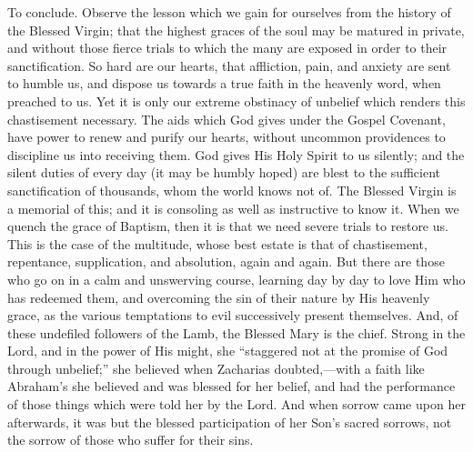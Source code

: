 To conclude. Observe the lesson which we gain for ourselves from the
history of the Blessed Virgin; that the highest graces of the soul may
be matured in private, and without those fierce trials to which the many
are exposed in order to their sanctification. So hard are our hearts,
that affliction, pain, and anxiety are sent to humble us, and dispose us
towards a true faith in the heavenly word, when preached to us. Yet it
is only our extreme obstinacy of unbelief which renders this
chastisement necessary. The aids which God gives under the Gospel
Covenant, have power to renew and purify our hearts, without uncommon
providences to discipline us into receiving them. God gives His Holy
Spirit to us silently; and the silent duties of every day (it may be
humbly hoped) are blest to the sufficient sanctification of thousands,
whom the world knows not of. The Blessed Virgin is a memorial of this;
and it is consoling as well as instructive to know it. When we quench
the grace of Baptism, then it is that we need severe trials to restore
us. This is the case of the multitude, whose best estate is that of
chastisement, repentance, supplication, and absolution, again and again.
But there are those who go on in a calm and unswerving course, learning
day by day to love Him who has redeemed them, and overcoming the sin of
their nature by His heavenly grace, as the various temptations to evil
successively present themselves. And, of these undefiled followers of
the Lamb, the Blessed Mary is the chief. Strong in the Lord, and in the
power of His might, she ``staggered not at the promise of God
through unbelief;'' she believed when Zacharias doubted,—with a
faith like Abraham's she believed and was blessed for her belief, and
had the performance of those things which were told her by the Lord. And
when sorrow came upon her afterwards, it was but the blessed
participation of her Son's sacred sorrows, not the sorrow of those who
suffer for their sins.


